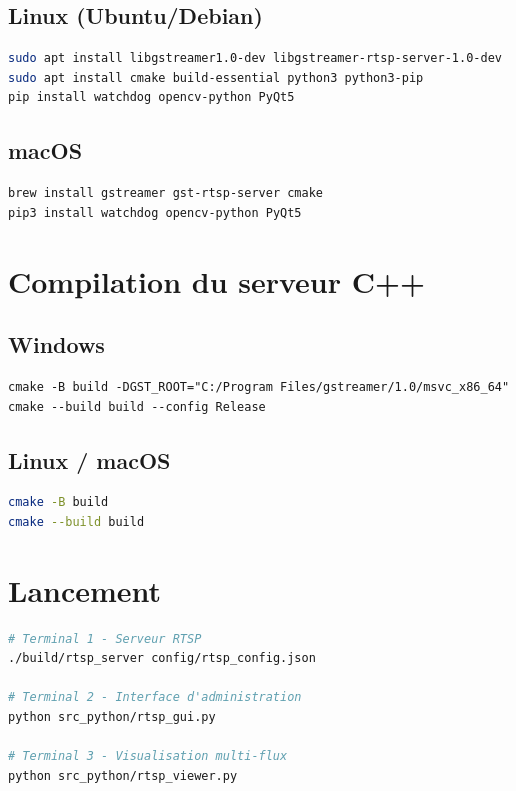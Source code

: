 \documentclass[12pt,a4paper]{report}
\begin{document}
\subsection{Linux (Ubuntu/Debian)}
\begin{lstlisting}[language=bash]
sudo apt install libgstreamer1.0-dev libgstreamer-rtsp-server-1.0-dev
sudo apt install cmake build-essential python3 python3-pip
pip install watchdog opencv-python PyQt5
\end{lstlisting}

\subsection{macOS}
\begin{lstlisting}[language=bash]
brew install gstreamer gst-rtsp-server cmake
pip3 install watchdog opencv-python PyQt5
\end{lstlisting}

\section{Compilation du serveur C++}

\subsection{Windows}
\begin{lstlisting}[language=batch]
cmake -B build -DGST_ROOT="C:/Program Files/gstreamer/1.0/msvc_x86_64"
cmake --build build --config Release
\end{lstlisting}

\subsection{Linux / macOS}
\begin{lstlisting}[language=bash]
cmake -B build
cmake --build build
\end{lstlisting}

\section{Lancement}

\begin{lstlisting}[language=bash]
# Terminal 1 - Serveur RTSP
./build/rtsp_server config/rtsp_config.json

# Terminal 2 - Interface d'administration
python src_python/rtsp_gui.py

# Terminal 3 - Visualisation multi-flux
python src_python/rtsp_viewer.py
\end{lstlisting}
\end{document}
